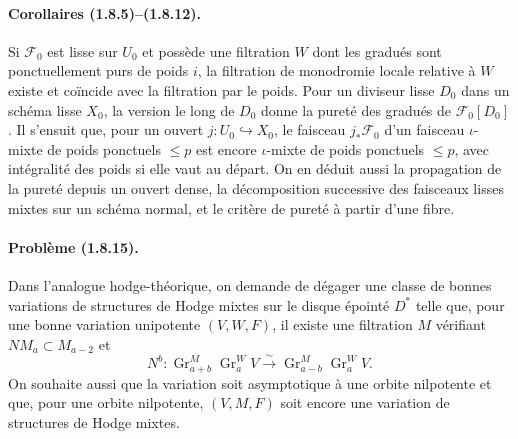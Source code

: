 \documentclass[11pt]{article}
\theoremstyle{remark}
\newcommand{\Gr}{\operatorname{Gr}}
\begin{document}
\paragraph{Corollaires (1.8.5)--(1.8.12).}
Si $\mathcal F_0$ est lisse sur $U_0$ et possède une filtration $W$ dont les gradués sont ponctuellement purs de poids $i$, la filtration de monodromie locale relative à $W$ existe et coïncide avec la filtration par le poids. Pour un diviseur lisse $D_0$ dans un schéma lisse $X_0$, la version le long de $D_0$ donne la pureté des gradués de $\mathcal F_0[D_0]$. Il s'ensuit que, pour un ouvert $j:U_0\hookrightarrow X_0$, le faisceau $j_*\mathcal F_0$ d'un faisceau $\iota$-mixte de poids ponctuels $\le p$ est encore $\iota$-mixte de poids ponctuels $\le p$, avec intégralité des poids si elle vaut au départ. On en déduit aussi la propagation de la pureté depuis un ouvert dense, la décomposition successive des faisceaux lisses mixtes sur un schéma normal, et le critère de pureté à partir d'une fibre.

\paragraph{Problème (1.8.15).}
Dans l'analogue hodge-théorique, on demande de dégager une classe de bonnes variations de structures de Hodge mixtes sur le disque épointé $D^*$ telle que, pour une bonne variation unipotente $(V,W,F)$, il existe une filtration $M$ vérifiant $NM_a\subset M_{a-2}$ et
\[
N^b:\Gr^M_{a+b}\Gr^W_aV\xrightarrow{\sim}\Gr^M_{a-b}\Gr^W_aV.
\]
On souhaite aussi que la variation soit asymptotique à une orbite nilpotente et que, pour une orbite nilpotente, $(V,M,F)$ soit encore une variation de structures de Hodge mixtes.
\end{document}
